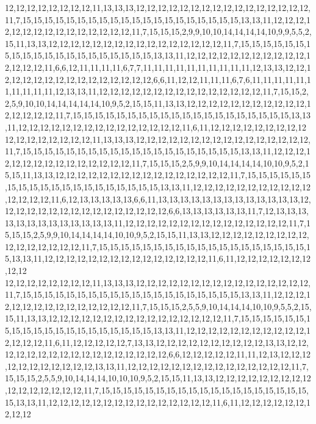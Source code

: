 12,12,12,12,12,12,12,12,11,13,13,13,12,12,12,12,12,12,12,12,12,12,12,12,12,12,12,12,11,7,15,15,15,15,15,15,15,15,15,15,15,15,15,15,15,15,15,15,15,15,13,13,11,12,12,12,12,12,12,12,12,12,12,12,12,12,12,12,11,7,15,15,15,2,9,9,10,10,14,14,14,14,10,9,9,5,5,2,15,11,13,13,12,12,12,12,12,12,12,12,12,12,12,12,12,12,12,12,11,7,15,15,15,15,15,15,15,15,15,15,15,15,15,15,15,15,15,15,15,15,13,13,11,12,12,12,12,12,12,12,12,12,12,12,12,12,12,12,11,6,6,12,11,11,11,11,6,7,7,11,11,11,11,11,11,11,11,11,11,12,13,13,12,12,12,12,12,12,12,12,12,12,12,12,12,12,12,12,6,6,11,12,12,11,11,11,6,7,6,11,11,11,11,11,11,11,11,11,11,12,13,13,11,12,12,12,12,12,12,12,12,12,12,12,12,12,12,12,11,7,15,15,2,2,5,9,10,10,14,14,14,14,14,10,9,5,2,15,15,11,13,13,12,12,12,12,12,12,12,12,12,12,12,12,12,12,12,12,11,7,15,15,15,15,15,15,15,15,15,15,15,15,15,15,15,15,15,15,15,15,13,13,11,12,12,12,12,12,12,12,12,12,12,12,12,12,12,12,11,6,11,12,12,12,12,12,12,12,12,12
12,12,12,12,12,12,12,12,11,13,13,13,12,12,12,12,12,12,12,12,12,12,12,12,12,12,12,12,11,7,15,15,15,15,15,15,15,15,15,15,15,15,15,15,15,15,15,15,15,15,13,13,11,12,12,12,12,12,12,12,12,12,12,12,12,12,12,12,11,7,15,15,15,2,5,9,9,10,14,14,14,14,10,10,9,5,2,15,15,11,13,13,12,12,12,12,12,12,12,12,12,12,12,12,12,12,12,12,11,7,15,15,15,15,15,15,15,15,15,15,15,15,15,15,15,15,15,15,15,15,13,13,11,12,12,12,12,12,12,12,12,12,12,12,12,12,12,12,11,6,12,13,13,13,13,13,6,6,11,13,13,13,13,13,13,13,13,13,13,13,13,13,12,12,12,12,12,12,12,12,12,12,12,12,12,12,12,12,6,6,13,13,13,13,13,13,11,7,12,13,13,13,13,13,13,13,13,13,13,13,13,13,11,12,12,12,12,12,12,12,12,12,12,12,12,12,12,12,11,7,15,15,15,2,5,9,9,10,14,14,14,14,10,10,9,5,2,15,15,11,13,13,12,12,12,12,12,12,12,12,12,12,12,12,12,12,12,12,11,7,15,15,15,15,15,15,15,15,15,15,15,15,15,15,15,15,15,15,15,15,13,13,11,12,12,12,12,12,12,12,12,12,12,12,12,12,12,12,11,6,11,12,12,12,12,12,12,12,12,12
12,12,12,12,12,12,12,12,11,13,13,13,12,12,12,12,12,12,12,12,12,12,12,12,12,12,12,12,11,7,15,15,15,15,15,15,15,15,15,15,15,15,15,15,15,15,15,15,15,15,13,13,11,12,12,12,12,12,12,12,12,12,12,12,12,12,12,12,11,7,15,15,15,2,5,5,9,10,14,14,14,10,10,9,5,5,2,15,15,11,13,13,12,12,12,12,12,12,12,12,12,12,12,12,12,12,12,12,11,7,15,15,15,15,15,15,15,15,15,15,15,15,15,15,15,15,15,15,15,15,13,13,11,12,12,12,12,12,12,12,12,12,12,12,12,12,12,12,11,6,11,12,12,12,12,12,7,13,13,12,12,12,12,12,12,12,12,12,12,13,13,12,12,12,12,12,12,12,12,12,12,12,12,12,12,12,12,12,6,6,12,12,12,12,12,11,11,12,13,12,12,12,12,12,12,12,12,12,12,12,13,13,11,12,12,12,12,12,12,12,12,12,12,12,12,12,12,12,11,7,15,15,15,2,5,5,9,10,14,14,14,10,10,10,9,5,2,15,15,11,13,13,12,12,12,12,12,12,12,12,12,12,12,12,12,12,12,12,11,7,15,15,15,15,15,15,15,15,15,15,15,15,15,15,15,15,15,15,15,15,13,13,11,12,12,12,12,12,12,12,12,12,12,12,12,12,12,12,11,6,11,12,12,12,12,12,12,12,12,12
